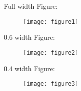 \documentclass[10pt]{article}
\begin{document}
Full width Figure:

\begin{figure}[!ht]
\texttt{[image: figure1]}
\end{figure}

0.6 width Figure:

\begin{figure}[!ht]
\texttt{[image: figure2]}
\end{figure}

0.4 width Figure:

\begin{figure}[!ht]
\texttt{[image: figure3]}
\end{figure}
\end{document}
